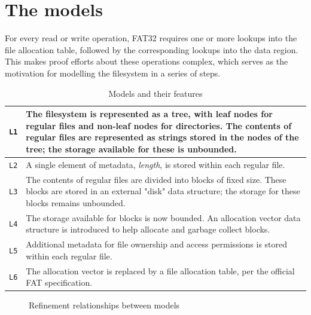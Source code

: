 \documentclass[runningheads,a4paper]{llncs}
\begin{document}
\section{The models}

For every read or write operation, FAT32 requires one or more lookups
into the file allocation table, followed by the corresponding lookups
into the data region. This makes proof efforts about these operations
complex, which serves as the motivation for modelling the filesystem
in a series of steps.

\begin{table}[]
  \centering
  \caption{Models and their features}
  \label{model-description-table}
  \begin{tabular}{|l|p{120mm}|}
    \hline
    \texttt{L1} & The filesystem is represented as a tree, with leaf
    nodes for regular files and non-leaf nodes for
    directories. The contents of regular files are represented as
    strings stored in the nodes of the tree; the storage available for
    these is unbounded. \\ \hline
    \texttt{L2} & A single element of metadata, \textit{length}, is
    stored within each regular file.  \\ \hline
    \texttt{L3} & The contents of regular files are divided into
    blocks of fixed size. These blocks are stored in an external
    "disk" data structure; the storage for these blocks remains
    unbounded. \\ \hline
    \texttt{L4} & The storage available for blocks is now bounded. An
    allocation vector data structure is introduced to help allocate
    and garbage collect blocks. \\ \hline
    \texttt{L5} & Additional metadata for file ownership and access
    permissions is stored within each regular file. \\ \hline
    \texttt{L6} & The allocation vector is replaced by a file
    allocation table, per the official FAT specification. \\ \hline
  \end{tabular}
\end{table}

\begin{figure}
  \centering
  \caption{Refinement relationships between models}
  \label{refinement-figure}
\end{figure}
\end{document}
